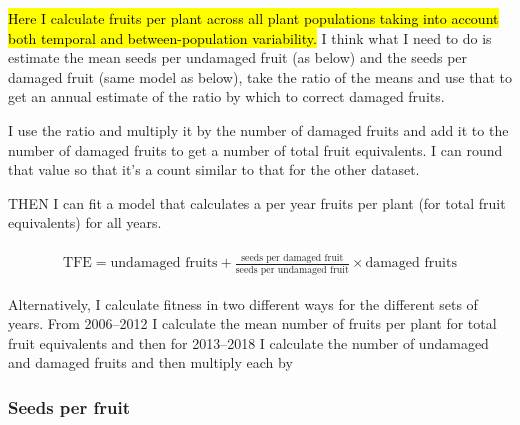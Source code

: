 \documentclass[12pt, oneside, titlepage]{article}   	%
\begin{document}
\hl{Here I calculate fruits per plant across all plant populations taking into account both temporal and between-population variability.} I think what I need to do is estimate the mean seeds per undamaged fruit (as below) and the seeds per damaged fruit (same model as below), take the ratio of the means and use that to get an annual estimate of the ratio by which to correct damaged fruits. 

I use the ratio and multiply it by the number of damaged fruits and add it to the number of damaged fruits to get a number of total fruit equivalents. I can round that value so that it's a count similar to that for the other dataset. 

THEN I can fit a model that calculates a per year fruits per plant (for total fruit equivalents) for all years. 

%
    \begin{align}
\begin{split}
\textrm{TFE} = \textrm{undamaged fruits} + \frac{\textrm{seeds per damaged fruit}}{\textrm{seeds per undamaged fruit}}\times  \textrm{damaged fruits} 
  \end{split}
\end{align}
%

Alternatively, I calculate fitness in two different ways for the different sets of years. From 2006--2012 I calculate the mean number of fruits per plant for total fruit equivalents and then for 2013--2018 I calculate the number of undamaged and damaged fruits and then multiply each by 


\subsubsection*{Seeds per fruit}
\end{document}
